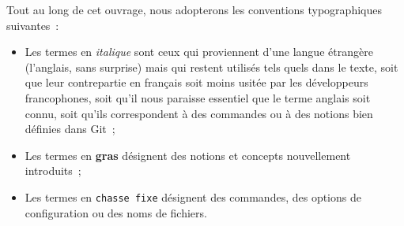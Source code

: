 Tout au long de cet ouvrage, nous adopterons les conventions
typographiques suivantes~:
\begin{itemize}
\item Les termes en \textit{italique} sont ceux qui proviennent d'une
  langue étrangère (l'anglais, sans surprise) mais qui restent
  utilisés tels quels dans le texte, soit que leur contrepartie en
  français soit moins usitée par les développeurs francophones, soit
  qu'il nous paraisse essentiel que le terme anglais soit connu, soit
  qu'ils correspondent à des commandes ou à des notions bien définies
  dans Git~;
\item Les termes en \textbf{gras} désignent des notions et concepts
  nouvellement introduits~;
\item Les termes en \texttt{chasse fixe} désignent des commandes, des
  options de configuration ou des noms de fichiers.
\end{itemize}